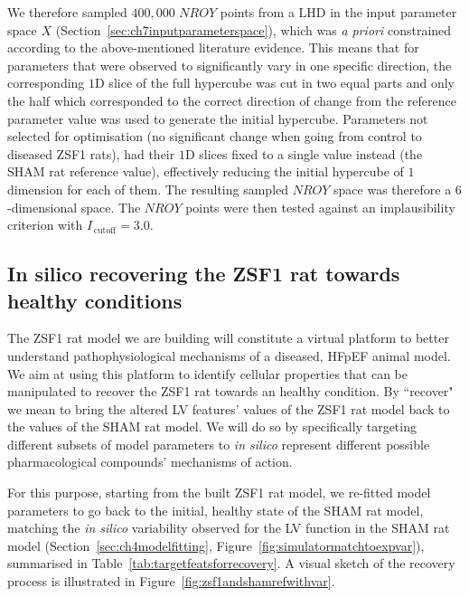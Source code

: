 \vspace{0.2cm}
We therefore sampled $400,000$ $NROY$ points from a LHD in the input parameter space $X$ (Section~\ref{sec:ch7inputparameterspace}), which was \textit{a priori} constrained according to the above-mentioned literature evidence. This means that for parameters that were observed to significantly vary in one specific direction, the corresponding $1$D slice of the full hypercube was cut in two equal parts and only the half which corresponded to the correct direction of change from the reference parameter value was used to generate the initial hypercube. Parameters not selected for optimisation (no significant change when going from control to diseased ZSF1 rats), had their $1$D slices fixed to a single value instead (the SHAM rat reference value), effectively reducing the initial hypercube of $1$ dimension for each of them. The resulting sampled $NROY$ space was therefore a $6$-dimensional space. The $NROY$ points were then tested against an implausibility criterion with $I_{\,\textrm{cutoff}}=3.0$.


%
%
%
\subsection{In silico recovering the ZSF1 rat towards healthy conditions}\label{sec:ch7insilicorecoveryingmethods}
The ZSF1 rat model we are building will constitute a virtual platform to better understand pathophysiological mechanisms of a diseased, HFpEF animal model. We aim at using this platform to identify cellular properties that can be manipulated to recover the ZSF1 rat towards an healthy condition. By ``recover" we mean to bring the altered LV features' values of the ZSF1 rat model back to the values of the SHAM rat model. We will do so by specifically targeting different subsets of model parameters to \textit{in silico} represent different possible pharmacological compounds' mechanisms of action.

\vspace{0.2cm}
For this purpose, starting from the built ZSF1 rat model, we re-fitted model parameters to go back to the initial, healthy state of the SHAM rat model, matching the \textit{in silico} variability observed for the LV function in the SHAM rat model (Section~\ref{sec:ch4modelfitting}, Figure~\ref{fig:simulatormatchtoexpvar}), summarised in Table~\ref{tab:targetfeatsforrecovery}. A visual sketch of the recovery process is illustrated in Figure~\ref{fig:zsf1andshamrefwithvar}.


